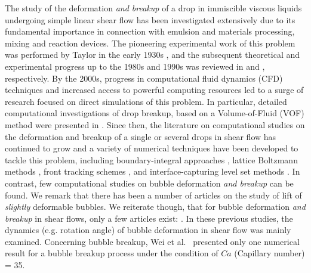 \documentclass[%
 reprint,
 showkeys,
 amsmath,amssymb,
 aps,
 prfluids,
 onecolumn
]{revtex4-2}
\begin{document}
%
%
The study of the deformation {\em and breakup} of a drop in immiscible viscous
liquids undergoing simple linear shear flow has been investigated extensively
due to its fundamental importance in connection with emulsion and materials
processing, mixing and reaction devices. The pioneering experimental work of
this problem was performed by Taylor in the early 1930s \cite{Tay32, Tay34},
and the subsequent theoretical and experimental progress up to the 1980s and
1990s was reviewed in \cite{Ral84} and \cite{Sto94}, respectively.  By the
2000s, progress in computational fluid dynamics (CFD) techniques and increased
access to powerful computing resources led to a surge of research focused on
direct simulations of this problem.  In particular, detailed computational
investigations of drop breakup, based on a Volume-of-Fluid (VOF) method
\cite{HirNic81} were presented in \cite{LiRenRen00, RenCri01-1, RenCri01-2,
RenCriLi02,KhiRenCri03,Ren06,Ren07,Ren08-2}.  Since then, the literature on
computational studies on the deformation and breakup of a single or several
drops in shear flow has continued to grow \cite{CriGuiAlfBlaLoe03,
InaTomOgi03,ZhaMikBan06, BazAndMei06, JanAnd08,
CroGriSch10,KomShaEskDer14,KomShaEskDer15, IoaLiuZha16,
HerRan17,AmaBalCasOli19, ZhaShuGuaYan21} and a variety of numerical techniques
have been developed to tackle this problem, including boundary-integral
approaches \cite{CriBlaLoe01, JanAnd07}, lattice Boltzmann methods \cite{Ina06,
KomShaEskDer14}, front tracking schemes \cite{UnvTry92}, and {\color{red}
interface-capturing} level set methods \cite{SusSmeOsh94}.  {\color{red} 
In contrast, few computational studies on bubble 
deformation {\em and breakup} can be found.  
We remark that there has been a 
number of articles on the study of lift of {\em slightly}
deformable bubbles\cite{ErvinANDTryggvason1997,legendre1998lift}.
We reiterate though, that for bubble deformation {\em and breakup} in
shear flows, only a few articles exist: \cite{WeiQiaXu12,WanShiZha15}.  
In these previous
studies, the dynamics (e.g. rotation angle) of bubble deformation 
in shear flow was mainly examined.} 
{\color{blue} Concerning bubble breakup, Wei et
al.~\cite{WeiQiaXu12} presented only one numerical result for a bubble breakup
process under the condition of $Ca$ (Capillary number) = 35.}
\end{document}
